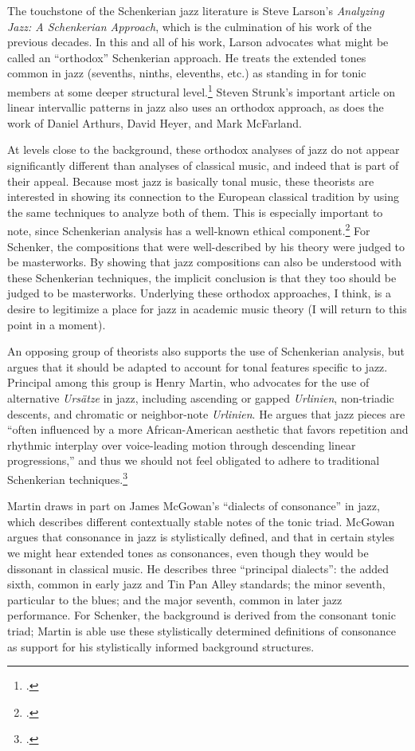 The touchstone of the Schenkerian jazz literature is Steve Larson’s
\emph{Analyzing Jazz: A Schenkerian Approach}, which is the culmination of his
work of the previous decades. In this and all of his work, Larson
advocates what might be called an “orthodox” Schenkerian approach. He treats
the extended tones common in jazz (sevenths, ninths, elevenths, etc.) as
standing in for tonic members at some deeper structural
level.\footcite[6]{larson:2009} Steven Strunk’s important article on linear
intervallic patterns in jazz also uses an orthodox approach, as does the work
of Daniel Arthurs, David Heyer, and Mark McFarland.

At levels close to the background, these orthodox analyses of jazz do not
appear significantly different than analyses of classical music, and indeed
that is part of their appeal. Because most jazz is basically tonal
music, these theorists are interested in showing its connection to the
European classical tradition by using the same techniques to analyze both of
them. This is especially important to note, since Schenkerian analysis has a
well-known ethical component.\footcite{cook:1989} For Schenker, the
compositions that were well-described by his theory were judged to be
masterworks. By showing that jazz compositions can also be understood with
these Schenkerian techniques, the implicit conclusion is that they too should
be judged to be masterworks. Underlying these orthodox approaches, I think, is
a desire to legitimize a place for jazz in academic music theory (I will
return to this point in a moment).

An opposing group of theorists also supports the use of Schenkerian analysis,
but argues that it should be adapted to account for tonal features specific to
jazz. Principal among this group is Henry Martin, who advocates for the use of
alternative \emph{Ursätze} in jazz, including ascending or gapped
\emph{Urlinien}, non-triadic descents, and chromatic or neighbor-note
\emph{Urlinien}. He argues that jazz pieces are “often influenced by
a more African-American aesthetic that favors repetition and rhythmic
interplay over voice-leading motion through descending linear progressions,”
and thus we should not feel obligated to adhere to traditional Schenkerian
techniques.\footcite[7]{martin:2011}

Martin draws in part on James McGowan’s “dialects of consonance” in jazz,
which describes different contextually stable notes of the tonic triad.
McGowan argues that consonance in jazz is stylistically defined, and that in
certain styles we might hear extended tones as consonances, even though they
would be dissonant in classical music. He describes three “principal dialects”:
the added sixth, common in early jazz and Tin Pan Alley standards; the minor
seventh, particular to the blues; and the major seventh, common in later jazz
performance. For Schenker, the background is derived from the
consonant tonic triad; Martin is able use these stylistically determined
definitions of consonance as support for his stylistically informed background
structures.

